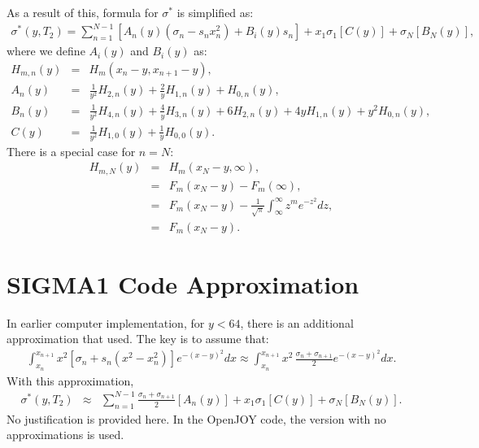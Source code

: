 As a result of this, formula for $\sigma^{*}$ is simplified as:
\begin{eqnarray}
\sigma^{*}(y,T_2) = \sum_{n=1}^{N-1}\left[A_{n}(y)(\sigma_n-s_nx_n^2)+B_{i}(y)s_n\right]+x_1\sigma_1\left[C(y)\right]+\sigma_N\left[B_N(y)\right],
\end{eqnarray}
where we define $A_{i}(y)$ and $B_{i}(y)$ as:
\begin{eqnarray}
H_{m,n}(y) &=& H_m(x_n-y, x_{n+1}-y),\\[1ex]
A_{n}(y) &=& \frac{1}{y^2}H_{2,n}(y)+\frac{2}{y}H_{1,n}(y)+H_{0,n}(y),\\
B_{n}(y) &=& \frac{1}{y^2}H_{4,n}(y)+\frac{4}{y}H_{3,n}(y)+6H_{2,n}(y)+4yH_{1,n}(y)+y^2H_{0,n}(y),\\
C(y) &=& \frac{1}{y^2}H_{1,0}(y)+\frac{1}{y}H_{0,0}(y).
\end{eqnarray}
There is a special case for $n=N$:
\begin{eqnarray}
H_{m,N}(y) &=& H_m(x_N-y,\infty),\nonumber\\
&=& F_m(x_N-y) - F_m(\infty),\nonumber\\
&=& F_m(x_N-y) - \frac{1}{\sqrt{\pi}}\int_{\infty}^{\infty}z^me^{-z^2}dz,\nonumber\\
&=& F_m(x_N-y).
\end{eqnarray}

\section{SIGMA1 Code Approximation}
In earlier computer implementation, for $y<64$, there is an additional approximation that used. The key is to assume that:
\begin{eqnarray}
\int_{x_n}^{x_{n+1}}x^2\left[\sigma_n+s_n(x^2-x_n^2)\right]e^{-(x-y)^2}dx \approx 
\int_{x_n}^{x_{n+1}}x^2\,\frac{\sigma_n+\sigma_{n+1}}{2}e^{-(x-y)^2}dx.
\end{eqnarray}
With this approximation,
\begin{eqnarray}
\sigma^{*}(y,T_2) &\approx& \sum_{n=1}^{N-1}\frac{\sigma_n+\sigma_{n+1}}{2}\left[A_{n}(y)\right]+x_1\sigma_1\left[C(y)\right]+\sigma_N\left[B_N(y)\right].
\end{eqnarray}
No justification is provided here. In the OpenJOY code, the version with no approximations is used.

